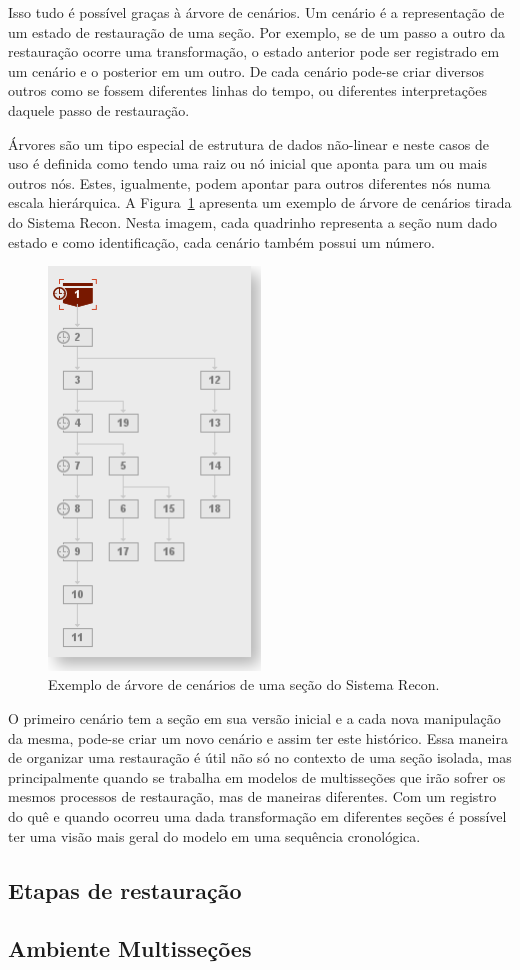 Isso tudo é possível graças à árvore de cenários. Um cenário é a representação de um estado de restauração de uma seção. Por exemplo, se de um passo a outro da restauração ocorre uma transformação, o estado anterior pode ser registrado em um cenário e o posterior em um outro. De cada cenário pode-se criar diversos outros como se fossem diferentes linhas do tempo, ou diferentes interpretações daquele passo de restauração.

Árvores são um tipo especial de estrutura de dados não-linear e neste casos de uso é definida como tendo uma raiz ou nó inicial que aponta para um ou mais outros nós. Estes, igualmente, podem apontar para outros diferentes nós numa escala hierárquica. A Figura~\ref{fig-recon-6} apresenta um exemplo de árvore de cenários tirada do Sistema Recon. Nesta imagem, cada quadrinho representa a seção num dado estado e como identificação, cada cenário também possui um número.

\begin{figure} [H]
  \begin{center}
    \includegraphics[width=160pt]{images/fig-recon-6}
    \caption{Exemplo de árvore de cenários de uma seção do Sistema Recon.}\label{fig-recon-6}
  \end{center}
\end{figure}

O primeiro cenário tem a seção em sua versão inicial e a cada nova manipulação da mesma, pode-se criar um novo cenário e assim ter este histórico. Essa maneira de organizar uma restauração é útil não só no contexto de uma seção isolada, mas principalmente quando se trabalha em modelos de multisseções que irão sofrer os mesmos processos de restauração, mas de maneiras diferentes. Com um registro do quê e quando ocorreu uma dada transformação em diferentes seções é possível ter uma visão mais geral do modelo em uma sequência cronológica.



\subsection{Etapas de restauração}



\subsection{Ambiente Multisseções}

